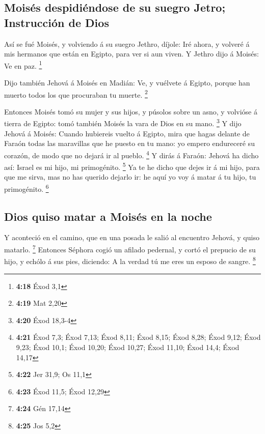 \hypertarget{moisuxe9s-despidiuxe9ndose-de-su-suegro-jetro-instrucciuxf3n-de-dios}{%
\subsection{Moisés despidiéndose de su suegro Jetro; Instrucción de
Dios}\label{moisuxe9s-despidiuxe9ndose-de-su-suegro-jetro-instrucciuxf3n-de-dios}}

 Así se fué Moisés, y volviendo á su suegro Jethro,
díjole: Iré ahora, y volveré á mis hermanos que están en Egipto, para
ver si aun viven. Y Jethro dijo á Moisés: Ve en paz. \footnote{\textbf{4:18}
  Éxod 3,1}

 Dijo también Jehová á Moisés en Madián: Ve, y vuélvete á
Egipto, porque han muerto todos los que procuraban tu muerte.
\footnote{\textbf{4:19} Mat 2,20}

 Entonces Moisés tomó su mujer y sus hijos, y púsolos
sobre un asno, y volvióse á tierra de Egipto: tomó también Moisés la
vara de Dios en su mano. \footnote{\textbf{4:20} Éxod 18,3-4}
 Y dijo Jehová á Moisés: Cuando hubiereis vuelto á
Egipto, mira que hagas delante de Faraón todas las maravillas que he
puesto en tu mano: yo empero endureceré su corazón, de modo que no
dejará ir al pueblo. \footnote{\textbf{4:21} Éxod 7,3; Éxod 7,13; Éxod
  8,11; Éxod 8,15; Éxod 8,28; Éxod 9,12; Éxod 9,23; Éxod 10,1; Éxod
  10,20; Éxod 10,27; Éxod 11,10; Éxod 14,4; Éxod 14,17} 
Y dirás á Faraón: Jehová ha dicho así: Israel es mi hijo, mi
primogénito. \footnote{\textbf{4:22} Jer 31,9; Os 11,1} 
Ya te he dicho que dejes ir á mi hijo, para que me sirva, mas no has
querido dejarlo ir: he aquí yo voy á matar á tu hijo, tu primogénito.
\footnote{\textbf{4:23} Éxod 11,5; Éxod 12,29}

\hypertarget{dios-quiso-matar-a-moisuxe9s-en-la-noche}{%
\subsection{Dios quiso matar a Moisés en la
noche}\label{dios-quiso-matar-a-moisuxe9s-en-la-noche}}

 Y aconteció en el camino, que en una posada le salió al
encuentro Jehová, y quiso matarlo. \footnote{\textbf{4:24} Gén 17,14}
 Entonces Séphora cogió un afilado pedernal, y cortó el
prepucio de su hijo, y echólo á sus pies, diciendo: A la verdad tú me
eres un esposo de sangre. \footnote{\textbf{4:25} Jos 5,2}

